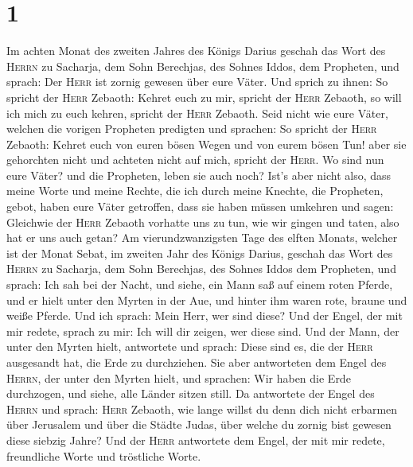 \hypertarget{section}{%
\section{1}\label{section}}

 Im achten Monat des zweiten Jahres des Königs Darius
geschah das Wort des \textsc{Herrn} zu Sacharja, dem Sohn Berechjas, des
Sohnes Iddos, dem Propheten, und sprach:  Der
\textsc{Herr} ist zornig gewesen über eure Väter.  Und
sprich zu ihnen: So spricht der \textsc{Herr} Zebaoth: Kehret euch zu
mir, spricht der \textsc{Herr} Zebaoth, so will ich mich zu euch kehren,
spricht der \textsc{Herr} Zebaoth.  Seid nicht wie eure
Väter, welchen die vorigen Propheten predigten und sprachen: So spricht
der \textsc{Herr} Zebaoth: Kehret euch von euren bösen Wegen und von
eurem bösen Tun! aber sie gehorchten nicht und achteten nicht auf mich,
spricht der \textsc{Herr}.  Wo sind nun eure Väter? und
die Propheten, leben sie auch noch?  Ist's aber nicht
also, dass meine Worte und meine Rechte, die ich durch meine Knechte,
die Propheten, gebot, haben eure Väter getroffen, dass sie haben müssen
umkehren und sagen: Gleichwie der \textsc{Herr} Zebaoth vorhatte uns zu
tun, wie wir gingen und taten, also hat er uns auch getan?
 Am vierundzwanzigsten Tage des elften Monats, welcher ist
der Monat Sebat, im zweiten Jahr des Königs Darius, geschah das Wort des
\textsc{Herrn} zu Sacharja, dem Sohn Berechjas, des Sohnes Iddos dem
Propheten, und sprach:  Ich sah bei der Nacht, und siehe,
ein Mann saß auf einem roten Pferde, und er hielt unter den Myrten in
der Aue, und hinter ihm waren rote, braune und weiße Pferde.
 Und ich sprach: Mein Herr, wer sind diese? Und der Engel,
der mit mir redete, sprach zu mir: Ich will dir zeigen, wer diese sind.
 Und der Mann, der unter den Myrten hielt, antwortete und
sprach: Diese sind es, die der \textsc{Herr} ausgesandt hat, die Erde zu
durchziehen.  Sie aber antworteten dem Engel des
\textsc{Herrn}, der unter den Myrten hielt, und sprachen: Wir haben die
Erde durchzogen, und siehe, alle Länder sitzen still.  Da
antwortete der Engel des \textsc{Herrn} und sprach: \textsc{Herr}
Zebaoth, wie lange willst du denn dich nicht erbarmen über Jerusalem und
über die Städte Judas, über welche du zornig bist gewesen diese siebzig
Jahre?  Und der \textsc{Herr} antwortete dem Engel, der
mit mir redete, freundliche Worte und tröstliche Worte. 
